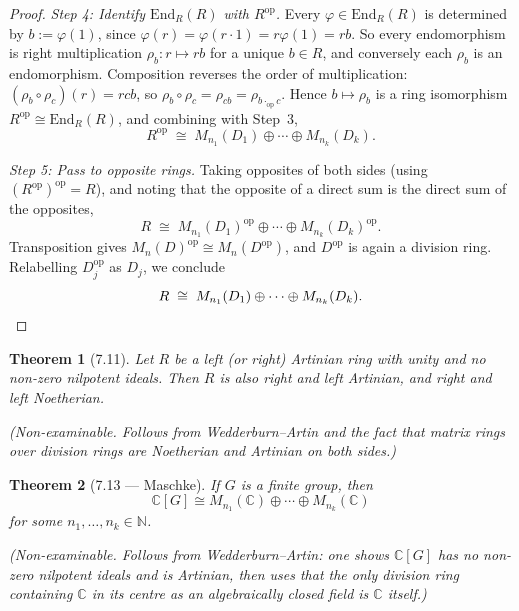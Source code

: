 \documentclass[12pt]{article}
\newtheorem{theorem}{Theorem}
\begin{document}
\begin{proof}
\smallskip
\textit{Step 4: Identify $\mathrm{End}_R(R)$ with $R^{\mathrm{op}}$.}
Every $\varphi \in \mathrm{End}_R(R)$ is determined by $b := \varphi(1)$, since $\varphi(r) = \varphi(r \cdot 1) = r\varphi(1) = rb$. So every endomorphism is right multiplication $\rho_b : r \mapsto rb$ for a unique $b \in R$, and conversely each $\rho_b$ is an endomorphism. Composition reverses the order of multiplication: $(\rho_b \circ \rho_c)(r) = rcb$, so $\rho_b \circ \rho_c = \rho_{cb} = \rho_{b \cdot_{\mathrm{op}} c}$. Hence $b \mapsto \rho_b$ is a ring isomorphism $R^{\mathrm{op}} \cong \mathrm{End}_R(R)$, and combining with Step~3,
\[
  R^{\mathrm{op}} \;\cong\; M_{n_1}(D_1) \oplus \cdots \oplus M_{n_k}(D_k).
\]

\smallskip
\textit{Step 5: Pass to opposite rings.}
Taking opposites of both sides (using $(R^{\mathrm{op}})^{\mathrm{op}} = R$), and noting that the opposite of a direct sum is the direct sum of the opposites,
\[
  R \;\cong\; M_{n_1}(D_1)^{\mathrm{op}} \oplus \cdots \oplus M_{n_k}(D_k)^{\mathrm{op}}.
\]
Transposition gives $M_n(D)^{\mathrm{op}} \cong M_n(D^{\mathrm{op}})$, and $D^{\mathrm{op}}$ is again a division ring. Relabelling $D_j^{\mathrm{op}}$ as $D_j$, we conclude
\[
  R \;\cong\; M_{n_1}(D_1) \oplus \cdots \oplus M_{n_k}(D_k). \qedhere
\]
\end{proof}

\begin{theorem}[7.11]
Let $R$ be a left (or right) Artinian ring with unity and no non-zero nilpotent ideals. Then $R$ is also right and left Artinian, and right and left Noetherian.
\end{theorem}

\noindent\textit{(Non-examinable. Follows from Wedderburn--Artin and the fact that matrix rings over division rings are Noetherian and Artinian on both sides.)}

\begin{theorem}[7.13 — Maschke]
If $G$ is a finite group, then
\[
  \mathbb{C}[G] \cong M_{n_1}(\mathbb{C}) \oplus \cdots \oplus M_{n_k}(\mathbb{C})
\]
for some $n_1, \ldots, n_k \in \mathbb{N}$.
\end{theorem}

\noindent\textit{(Non-examinable. Follows from Wedderburn--Artin: one shows $\mathbb{C}[G]$ has no non-zero nilpotent ideals and is Artinian, then uses that the only division ring containing $\mathbb{C}$ in its centre as an algebraically closed field is $\mathbb{C}$ itself.)}
\end{document}
